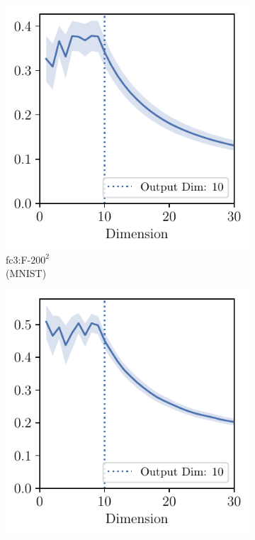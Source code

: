 \begin{figure}[H]
    \centering
    \begin{subfigure}[b]{0.24\textwidth}
        \centering
        \captionsetup{justification=centering}
        \includegraphics[width=\textwidth]{Appendix_Figures/Overlap_large_model/overlap_raw/last_layer/DimOverlap_MNIST_FC2_fixlr0.01_fc3.pdf}
        \caption{fc3:F-$200^2$\\(MNIST)}
        \label{fig:app_adexp_last_fc2}
    \end{subfigure}
    \begin{subfigure}[b]{0.24\textwidth}
        \centering
        \captionsetup{justification=centering}
        \includegraphics[width=\textwidth]{Appendix_Figures/Overlap_large_model/overlap_raw/last_layer/DimOverlap_CIFAR10_LeNet5_normnew_fixlr0.01_fc3.pdf}

\end{subfigure}
\end{figure}
